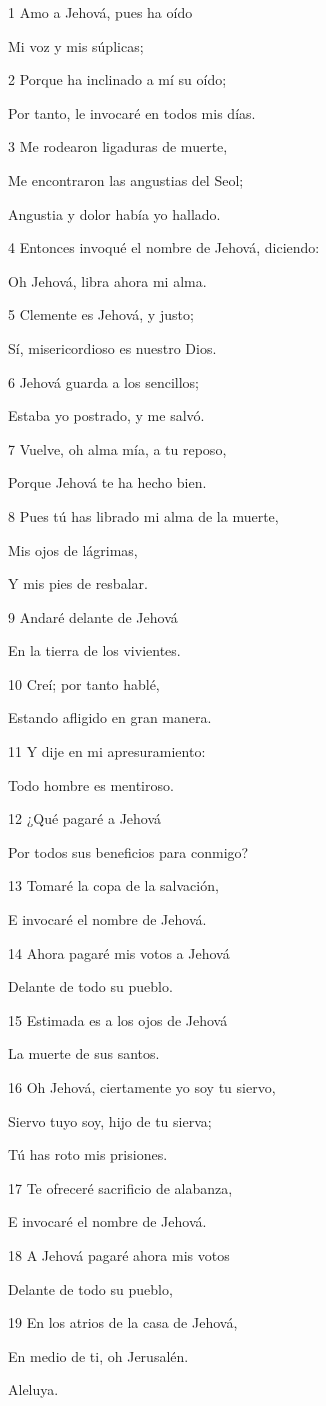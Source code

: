 \par 1 Amo a Jehová, pues ha oído
\par Mi voz y mis súplicas;
\par 2 Porque ha inclinado a mí su oído;
\par Por tanto, le invocaré en todos mis días.
\par 3 Me rodearon ligaduras de muerte,
\par Me encontraron las angustias del Seol;
\par Angustia y dolor había yo hallado.
\par 4 Entonces invoqué el nombre de Jehová, diciendo:
\par Oh Jehová, libra ahora mi alma.
\par 5 Clemente es Jehová, y justo;
\par Sí, misericordioso es nuestro Dios.
\par 6 Jehová guarda a los sencillos;
\par Estaba yo postrado, y me salvó.
\par 7 Vuelve, oh alma mía, a tu reposo,
\par Porque Jehová te ha hecho bien.
\par 8 Pues tú has librado mi alma de la muerte,
\par Mis ojos de lágrimas,
\par Y mis pies de resbalar.
\par 9 Andaré delante de Jehová
\par En la tierra de los vivientes.
\par 10 Creí; por tanto hablé,
\par Estando afligido en gran manera.
\par 11 Y dije en mi apresuramiento:
\par Todo hombre es mentiroso.
\par 12 ¿Qué pagaré a Jehová
\par Por todos sus beneficios para conmigo?
\par 13 Tomaré la copa de la salvación,
\par E invocaré el nombre de Jehová.
\par 14 Ahora pagaré mis votos a Jehová
\par Delante de todo su pueblo.
\par 15 Estimada es a los ojos de Jehová
\par La muerte de sus santos.
\par 16 Oh Jehová, ciertamente yo soy tu siervo,
\par Siervo tuyo soy, hijo de tu sierva;
\par Tú has roto mis prisiones.
\par 17 Te ofreceré sacrificio de alabanza,
\par E invocaré el nombre de Jehová.
\par 18 A Jehová pagaré ahora mis votos
\par Delante de todo su pueblo,
\par 19 En los atrios de la casa de Jehová,
\par En medio de ti, oh Jerusalén.
\par Aleluya.

